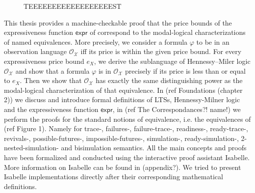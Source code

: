 \begin{isabellebody}
\begin{isamarkuptext}
\begin{figure}[htbp]
\caption{TEEEEEEEEEEEEEEEEEEST}
    \label{fig:your_label}
\end{figure}%
\end{isamarkuptext}\isamarkuptrue%
%
\isadelimdocument
%
\endisadelimdocument
%
\isatagdocument
%
\isamarkuptrue%
%
\endisatagdocument
{\isafolddocument}%
%
\isadelimdocument
%
\endisadelimdocument
%
\begin{isamarkuptext}%
This thesis provides a machine-checkable proof that the price bounds of the expressiveness function $\textsf{expr}$ of \cite{bisping2023process} correspond to the modal-logical characterizations of named equivalences. 
More precisely, we consider a formula $\varphi$ to be in an observation language $\mathcal{O_X}$ iff its price is within the given price bound.
For every expressiveness price bound $e_X$, we derive the sublanguage of Hennessy--Miler logic $\mathcal{O_X}$ and show that a formula $\varphi$ is in $\mathcal{O_X}$ precisely if its price  is less than or equal to $e_X$.
Then we show that $\mathcal{O_X}$ has exactly the same distinguishing power as the modal-logical characterization of that equivalence.
In (ref Foundations (chapter 2)) we discuss and introduce formal definitions of LTSs, Hennessy-Milner logic and the expressiveness function $\textsf{expr}$, in (ref The Correspondances?! name!) we perform
the proofs for the standard notions of equivalence, i.e. the equivalences of (ref Figure 1). Namely for trace-, failures-, failure-trace-, readiness-, ready-trace-, revivals-, possible-futures-, impossible-futures-, simulation-, ready-simulation-, 2-nested-simulation- and bisimulation semantics.
All the main concepts and proofs have been formalized and conducted using the interactive proof assistant Isabelle. More information on Isabelle can be found in (appendix?).
We tried to present Isabelle implementations directly after their corresponding mathematical definitions.

\end{isamarkuptext}
\end{isabellebody}

